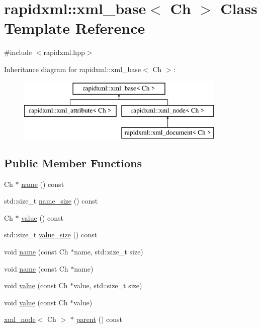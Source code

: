 \hypertarget{classrapidxml_1_1xml__base}{\section{rapidxml\+:\+:xml\+\_\+base$<$ Ch $>$ Class Template Reference}
\label{classrapidxml_1_1xml__base}
}


{\ttfamily \#include $<$rapidxml.\+hpp$>$}

Inheritance diagram for rapidxml\+:\+:xml\+\_\+base$<$ Ch $>$\+:\begin{figure}[H]
\begin{center}
\leavevmode
\includegraphics[height=3.000000cm]{classrapidxml_1_1xml__base}
\end{center}
\end{figure}
\subsection*{Public Member Functions}
\begin{DoxyCompactItemize}
\item 
Ch $\ast$ \hyperlink{classrapidxml_1_1xml__base_a9a09739310469995db078ebd0da3ed45}{name} () const 
\item 
std\+::size\+\_\+t \hyperlink{classrapidxml_1_1xml__base_a7e7f98b3d01e1eab8dc1ca69aad9af84}{name\+\_\+size} () const 
\item 
Ch $\ast$ \hyperlink{classrapidxml_1_1xml__base_adcdaccff61c665f039d9344e447b7445}{value} () const 
\item 
std\+::size\+\_\+t \hyperlink{classrapidxml_1_1xml__base_a9fcf201ed0915ac18dd43b0b5dcfaf32}{value\+\_\+size} () const 
\item 
void \hyperlink{classrapidxml_1_1xml__base_ae55060ae958c6e6465d6c8db852ec6ce}{name} (const Ch $\ast$name, std\+::size\+\_\+t size)
\item 
void \hyperlink{classrapidxml_1_1xml__base_a4611ddc82ac83a527c65606600eb2a0d}{name} (const Ch $\ast$name)
\item 
void \hyperlink{classrapidxml_1_1xml__base_a3b183c2db7022a6d30494dd2f0ac11e9}{value} (const Ch $\ast$value, std\+::size\+\_\+t size)
\item 
void \hyperlink{classrapidxml_1_1xml__base_a81e63ec4bfd2d7ef0a6c2ed49be6e623}{value} (const Ch $\ast$value)
\item 
\hyperlink{singletonrapidxml_1_1xml__node}{xml\+\_\+node}$<$ Ch $>$ $\ast$ \hyperlink{classrapidxml_1_1xml__base_a7f31ae930f93852830234db1ae59c4c4}{parent} () const 
\end{DoxyCompactItemize}
